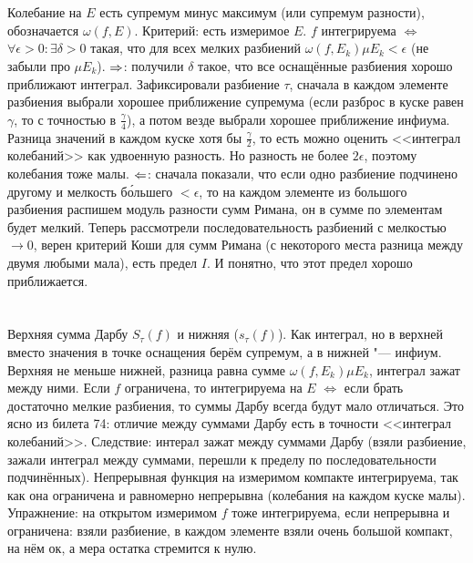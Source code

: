 \section{} %
Колебание на $E$ есть супремум минус максимум (или супремум разности), обозначается $\omega(f, E)$.
Критерий: есть измеримое $E$.
$f$ интегрируема $\iff$ $\forall \epsilon > 0 \colon \exists \delta > 0$ такая, что для всех мелких разбиений $\omega(f, E_k)\mu E_k < \epsilon$ (не забыли про $\mu E_k$).
$\Rightarrow$: получили $\delta$ такое, что все оснащённые разбиения хорошо приближают интеграл.
Зафиксировали разбиение $\tau$, сначала в каждом элементе разбиения выбрали хорошее приближение супремума (если разброс в куске равен $\gamma$, то с точностью в $\frac \gamma 4$),
а потом везде выбрали хорошее приближение инфиума.
Разница значений в каждом куске хотя бы $\frac \gamma 2$, то есть можно оценить <<интеграл колебаний>> как удвоенную разность.
Но разность не более $2\epsilon$, поэтому колебания тоже малы.
$\Leftarrow$: сначала показали, что если одно разбиение подчинено другому и мелкость б\'ольшего $< \epsilon$, то на каждом элементе из большого разбиения распишем модуль разности сумм Римана,
он в сумме по элементам будет мелкий.
Теперь рассмотрели последовательность разбиений с мелкостью $\to 0$, верен критерий Коши для сумм Римана (с некоторого места разница между двумя любыми мала), есть предел $I$.
И понятно, что этот предел хорошо приближается.

\section{} %
Верхняя сумма Дарбу $S_{\tau}(f)$ и нижняя ($s_{\tau}(f)$).
Как интеграл, но в верхней вместо значения в точке оснащения берём супремум, а в нижней "--- инфиум.
Верхняя не меньше нижней, разница равна сумме $\omega(f, E_k)\mu E_k$, интеграл зажат между ними.
Если $f$ ограничена, то интегрируема на $E$ $\iff$ если брать достаточно мелкие разбиения, то суммы Дарбу всегда будут мало отличаться.
Это ясно из билета 74: отличие между суммами Дарбу есть в точности <<интеграл колебаний>>.
Следствие: интерал зажат между суммами Дарбу (взяли разбиение, зажали интеграл между суммами, перешли к пределу по последовательности подчинённых).
Непрерывная функция на измеримом компакте интегрируема, так как она ограничена и равномерно непрерывна (колебания на каждом куске малы).
Упражнение: на открытом измеримом $f$ тоже интегрируема, если непрерывна и ограничена: взяли разбиение, в каждом элементе взяли очень большой компакт, на нём ок, а мера остатка стремится к нулю.

